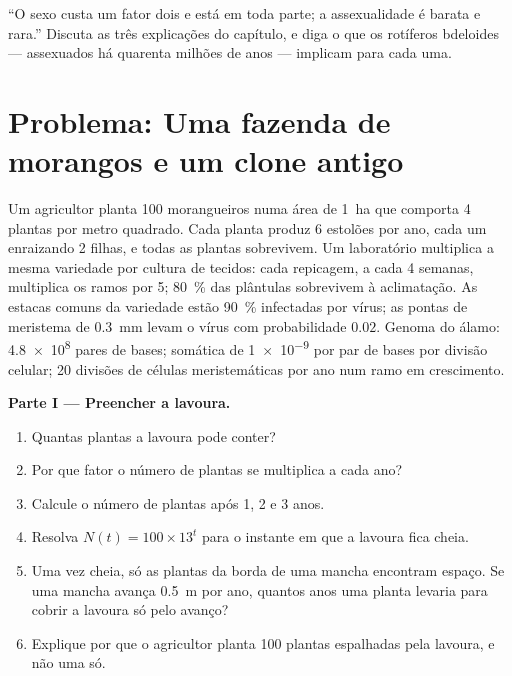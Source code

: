 \begin{exercise}[$\star\star\star$]\label{exo:b2:asexual-reproduction:12}
``O sexo custa um fator dois e está em toda parte; a assexualidade é
barata e rara.'' Discuta as três explicações do capítulo, e diga o que
os rotíferos bdeloides --- assexuados há quarenta milhões de anos ---
implicam para cada uma.
\end{exercise}

\section{Problema: Uma fazenda de morangos e um clone antigo}

\begin{problem}
\label{pb:b2:asexual-reproduction:1}
Um agricultor planta \num{100} morangueiros numa área de \qty{1}{ha}
que comporta \num{4} plantas por metro quadrado. Cada planta produz
\num{6} estolões por ano, cada um enraizando \num{2} filhas, e todas as
plantas sobrevivem. Um laboratório multiplica a mesma variedade por
cultura de tecidos: cada repicagem, a cada \num{4} semanas, multiplica
os ramos por \num{5}; \qty{80}{\%} das plântulas sobrevivem à
aclimatação. As estacas comuns da variedade estão \qty{90}{\%}
infectadas por vírus; as pontas de meristema de \qty{0.3}{mm} levam o
vírus com probabilidade $0.02$. Genoma do álamo: \qty{4.8e8}{} pares
de bases;  somática de \qty{1e-9}{} por par de bases
por divisão celular; \num{20} divisões de células meristemáticas por
ano num ramo em crescimento.

\medskip
\noindent\textbf{Parte I --- Preencher a lavoura.}
\begin{enumerate}
  \item Quantas plantas a lavoura pode conter?
  \item Por que fator o número de plantas se multiplica a cada ano?
  \item Calcule o número de plantas após 1, 2 e 3 anos.
  \item Resolva $N(t) = 100\times 13^{t}$ para o instante em que a
        lavoura fica cheia.
  \item Uma vez cheia, só as plantas da borda de uma mancha encontram
        espaço. Se uma mancha avança \qty{0.5}{m} por ano, quantos anos
        uma planta levaria para cobrir a lavoura só pelo avanço?
  \item Explique por que o agricultor planta \num{100} plantas
        espalhadas pela lavoura, e não uma só.
\end{enumerate}


\end{problem}

